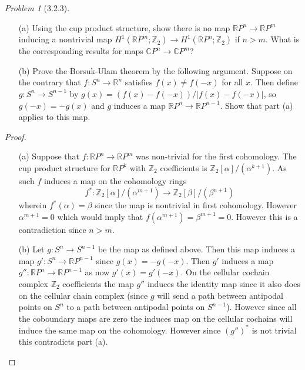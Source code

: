 \documentclass[10pt]{article}
\newcommand{\bb}[1]{\mathbb{#1}}
\theoremstyle{remark}
\newtheorem{problem}{Problem}
\begin{document}
\begin{problem}[3.2.3]
  \begin{enumerate}
  \item[(a)] Using the cup product structure, show there is no map
    $\bb{R}P^n\rightarrow\bb{R}P^m$ inducing a nontrivial map
    $H^1(\bb{R}P^m;\bb{Z}_2)\rightarrow H^1(\bb{R}P^n;\bb{Z}_2)$ if $n>m$. What
    is the corresponding results for maps $\bb{C}P^n\rightarrow\bb{C}P^m$?
  \item[(b)] Prove the Borsuk-Ulam theorem by the following argument. Suppose on
    the contrary that $f:S^n\rightarrow \bb{R}^n$ satisfies $f(x)\neq f(-x)$ for
    all $x$. Then define $g:S^n\rightarrow S^{n-1}$ by
    $g(x)=(f(x)-f(-x))/|f(x)-f(-x)|$, so $g(-x)=-g(x)$
    and $g$ induces a map $\bb{R}P^n\rightarrow\bb{R}P^{n-1}$. Show that
    part (a) applies to this map.
  \end{enumerate}
\end{problem}

\begin{proof}
  \begin{enumerate}
  \item[(a)] Suppose that $f:\bb{R}P^n\rightarrow\bb{R}P^m$ was non-trivial for the first
    cohomology. The cup product structure for $\bb{R}P^k$ with $\bb{Z}_2$ coefficients
    is $\bb{Z}_2[\alpha]/(\alpha^{k+1})$. As such $f$ induces a map on the cohomology rings
    \[
      f^*:\bb{Z}_2[\alpha]/(\alpha^{m+1})\rightarrow\bb{Z}_2[\beta]/(\beta^{n+1})
    \]
    wherein $f^*(\alpha)=\beta$ since the map is nontrivial in first cohomology. However
    $\alpha^{m+1}=0$ which would imply that $f(\alpha^{m+1})=\beta^{m+1}=0$. However this is
    a contradiction since $n>m$.
  \item[(b)] Let $g:S^n\rightarrow S^{n-1}$ be the map as defined above. Then
    this map induces a map $g':S^n\rightarrow\bb{R}P^{n-1}$ since $g(x)=-g(-x)$.
    Then $g'$ induces a map $g'':\bb{R}P^n\rightarrow\bb{R}P^{n-1}$ as now $g'(x)=g'(-x)$.
    On the cellular cochain complex $\bb{Z}_2$ coefficients the map $g''$
    induces the identity map since it also does on the cellular chain complex (since $g$
    will send a path between antipodal points on $S^n$ to a path between antipodal points
    on $S^{n-1}$).
    However since all the coboundary maps are zero the induces map on the cellular
    cochains will induce the same map on the cohomology. However since $(g'')^*$ is
    not trivial this contradicts part (a).
  \end{enumerate}
\end{proof}
\end{document}
